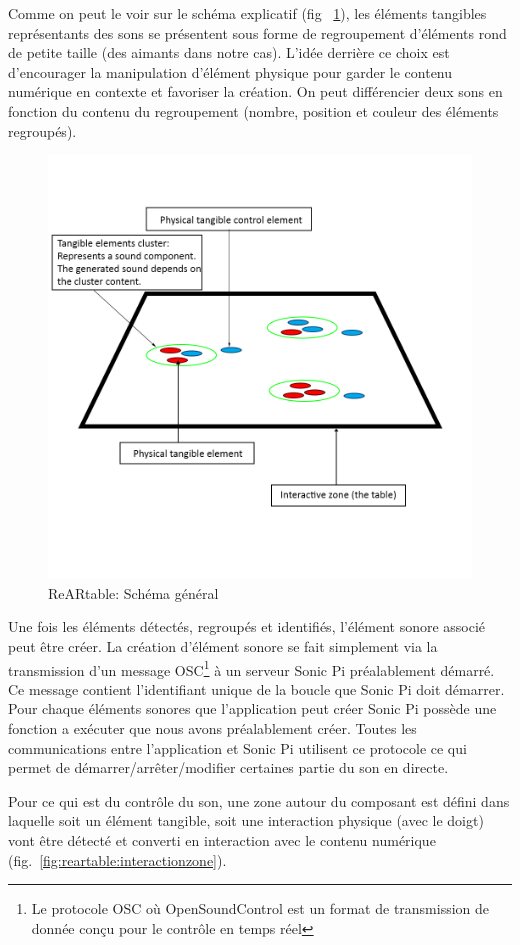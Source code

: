 Comme on peut le voir sur le schéma explicatif (fig ~\ref{fig:reartable:generalscheme}), les éléments tangibles représentants des sons se présentent sous forme de regroupement d'éléments rond de petite taille (des aimants dans notre cas). L'idée derrière ce choix est d'encourager la manipulation d'élément physique pour garder le contenu numérique en contexte et favoriser la création. On peut différencier deux sons en fonction du contenu du regroupement (nombre, position et couleur des éléments regroupés).

\begin{figure}[H]
\centering
\includegraphics[width=0.5\linewidth]{images/rearproto}
\caption{ReARtable: Schéma général}
\label{fig:reartable:generalscheme}
\end{figure}

Une fois les éléments détectés, regroupés et identifiés, l'élément sonore associé peut être créer. La création d'élément sonore se fait simplement via la transmission d'un message OSC\footnote{Le protocole OSC où OpenSoundControl est un format de transmission de donnée conçu pour le contrôle en temps réel} à un serveur Sonic Pi préalablement démarré. Ce message contient l'identifiant unique de la boucle que Sonic Pi doit démarrer. Pour chaque éléments sonores que l'application peut créer Sonic Pi possède une fonction a exécuter que nous avons préalablement créer. Toutes les communications entre l'application et Sonic Pi utilisent ce protocole ce qui permet de démarrer/arrêter/modifier certaines partie du son en directe.

Pour ce qui est du contrôle du son, une zone autour du composant est défini dans laquelle soit un élément tangible, soit une interaction physique (avec le doigt) vont être détecté et converti en interaction avec le contenu numérique (fig.~\ref{fig:reartable:interactionzone}).

